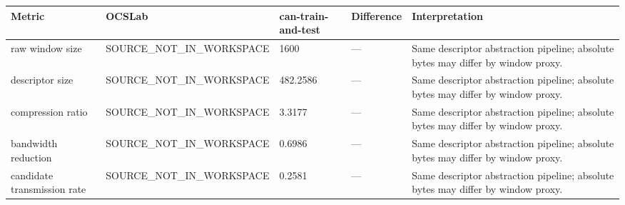 \begin{tabular}{lllll}
\toprule
Metric & OCSLab & can-train-and-test & Difference & Interpretation \\
\midrule
raw window size & SOURCE_NOT_IN_WORKSPACE & 1600 & — & Same descriptor abstraction pipeline; absolute bytes may differ by window proxy. \\
descriptor size & SOURCE_NOT_IN_WORKSPACE & 482.2586 & — & Same descriptor abstraction pipeline; absolute bytes may differ by window proxy. \\
compression ratio & SOURCE_NOT_IN_WORKSPACE & 3.3177 & — & Same descriptor abstraction pipeline; absolute bytes may differ by window proxy. \\
bandwidth reduction & SOURCE_NOT_IN_WORKSPACE & 0.6986 & — & Same descriptor abstraction pipeline; absolute bytes may differ by window proxy. \\
candidate transmission rate & SOURCE_NOT_IN_WORKSPACE & 0.2581 & — & Same descriptor abstraction pipeline; absolute bytes may differ by window proxy. \\
\bottomrule
\end{tabular}
